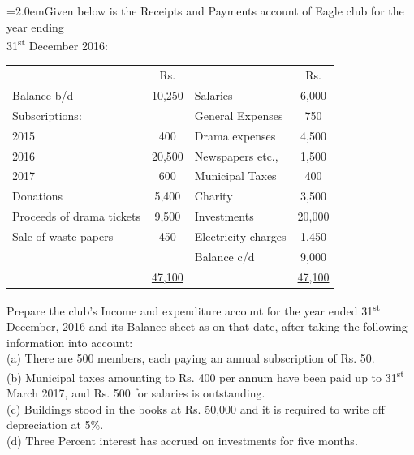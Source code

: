 \documentclass[11pt,a4paper]{article}
\newcommand{\lqn}[2]{\Needspace{6\baselineskip}\par\medskip\noindent\hangindent=2.0em\hangafter=1\makebox[2.0em][l]{\textbf{#1.}}#2\par}
\begin{document}
\lqn{24}{Given below is the Receipts and Payments account of Eagle club for the year ending\\
31\textsuperscript{st}  December 2016:\par
\par\smallskip\noindent\hspace*{1.2em}\begin{tabular}{|lclc|}
\hline
 & Rs. &  & Rs. \\
Balance b/d & 10,250 & Salaries & 6,000 \\
Subscriptions: &  & General Expenses & 750 \\
2015 & 400 & Drama expenses & 4,500 \\
2016 & 20,500 & Newspapers etc., & 1,500 \\
2017 & 600 & Municipal Taxes & 400 \\
Donations & 5,400 & Charity & 3,500 \\
Proceeds of drama tickets & 9,500 & Investments & 20,000 \\
Sale of waste papers & 450 & Electricity charges & 1,450 \\
 &  & Balance c/d & 9,000 \\
 & \underline{47,100} &  & \underline{47,100} \\
\hline
\end{tabular}\par\smallskip
Prepare the club’s Income and expenditure account for the year ended 31\textsuperscript{st}  December, 2016 and its Balance sheet as on that date, after taking the following information into account:\\
(a)  There are 500 members, each paying an annual subscription of Rs. 50.\\
(b) Municipal taxes amounting to Rs. 400 per annum have been paid up to 31\textsuperscript{st}  March 2017, and Rs. 500 for salaries is outstanding.\\
(c)  Buildings stood in the books at Rs. 50,000 and it is required to write off depreciation at 5\%.\\
(d)  Three Percent interest has accrued on investments for five months.\par
}
\end{document}
